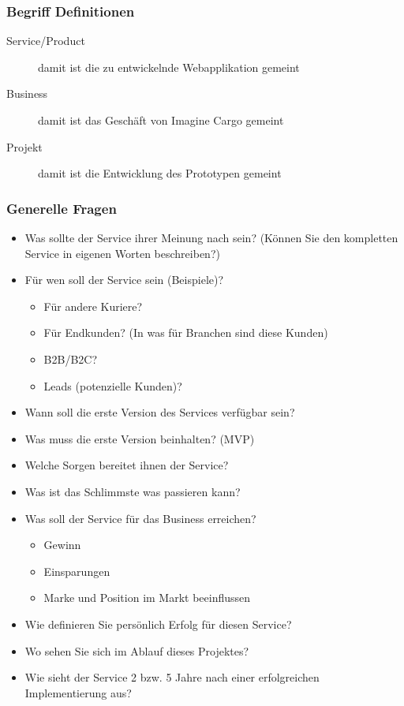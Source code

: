 \subsubsection{Begriff Definitionen}
\begin{description}
  \item[Service/Product] damit ist die zu entwickelnde Webapplikation gemeint
  \item[Business] damit ist das Geschäft von Imagine Cargo gemeint
  \item[Projekt] damit ist die Entwicklung des Prototypen gemeint
\end{description}

\subsubsection{Generelle Fragen}
\begin{itemize}
  \item Was sollte der Service ihrer Meinung nach sein? (Können Sie den kompletten Service in eigenen Worten beschreiben?)
  \item Für wen soll der Service sein (Beispiele)?
  \begin{itemize}
    \item Für andere Kuriere?
    \item Für Endkunden? (In was für Branchen sind diese Kunden)
    \item B2B/B2C?
    \item Leads (potenzielle Kunden)?
  \end{itemize}
  \item Wann soll die erste Version des Services verfügbar sein?
  \item Was muss die erste Version beinhalten? (MVP)
  \item Welche Sorgen bereitet ihnen der Service?
  \item Was ist das Schlimmste was passieren kann?
  \item Was soll der Service für das Business erreichen?
  \begin{itemize}
    \item Gewinn
    \item Einsparungen
    \item Marke und Position im Markt beeinflussen
  \end{itemize}
  \item Wie definieren Sie persönlich Erfolg für diesen Service?
  \item Wo sehen Sie sich im Ablauf dieses Projektes?
  \item Wie sieht der Service 2 bzw. 5 Jahre nach einer erfolgreichen Implementierung aus?
\end{itemize}

